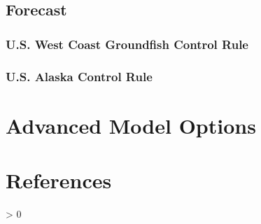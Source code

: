 \documentclass[11pt,
  english,
  letterpaper,
]{article}
\newlength{\cslhangindent}
\newenvironment{CSLReferences}[2] %
 {%
  \setlength{\parindent}{0pt}
  \ifodd #1 \everypar{\setlength{\hangindent}{\cslhangindent}}\ignorespaces\fi
  \ifnum #2 > 0
  \setlength{\parskip}{#2\baselineskip}
  \fi
 }%
 {}
\begin{document}
\leavevmode\tagmcend\tagstructend


\hypertarget{forecast}{%
\subsection{Forecast}\label{forecast}}

\leavevmode\tagmcend\tagstructend


\hypertarget{u.s.-west-coast-groundfish-control-rule}{%
\subsubsection{U.S. West Coast Groundfish Control Rule}\label{u.s.-west-coast-groundfish-control-rule}}

\leavevmode\tagmcend\tagstructend


\hypertarget{u.s.-alaska-control-rule}{%
\subsubsection{U.S. Alaska Control Rule}\label{u.s.-alaska-control-rule}}

\leavevmode\tagmcend\tagstructend


\hypertarget{advanced-model-options}{%
\section{Advanced Model Options}\label{advanced-model-options}}

\leavevmode\tagmcend\tagstructend

\clearpage


\hypertarget{references}{%
\section{References}\label{references}}

\leavevmode\tagmcend\tagstructend


\hypertarget{refs}{}
\begin{CSLReferences}{0}{0}
\end{CSLReferences}

\leavevmode\tagmcend\tagstructend
\end{document}
